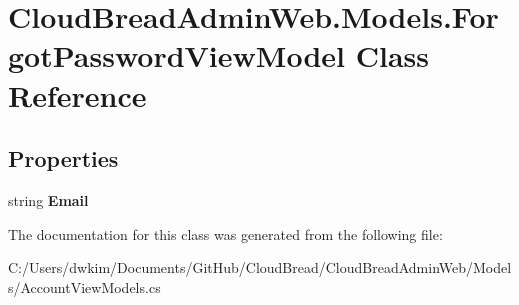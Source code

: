 \hypertarget{class_cloud_bread_admin_web_1_1_models_1_1_forgot_password_view_model}{}\section{Cloud\+Bread\+Admin\+Web.\+Models.\+Forgot\+Password\+View\+Model Class Reference}
\label{class_cloud_bread_admin_web_1_1_models_1_1_forgot_password_view_model}
\subsection*{Properties}
\begin{DoxyCompactItemize}
\item 
string {\bfseries Email}\hypertarget{class_cloud_bread_admin_web_1_1_models_1_1_forgot_password_view_model_af77b60581e2d17267d66cef30a60a6c1}{}\label{class_cloud_bread_admin_web_1_1_models_1_1_forgot_password_view_model_af77b60581e2d17267d66cef30a60a6c1}

\end{DoxyCompactItemize}


The documentation for this class was generated from the following file\+:\begin{DoxyCompactItemize}
\item 
C\+:/\+Users/dwkim/\+Documents/\+Git\+Hub/\+Cloud\+Bread/\+Cloud\+Bread\+Admin\+Web/\+Models/Account\+View\+Models.\+cs\end{DoxyCompactItemize}

